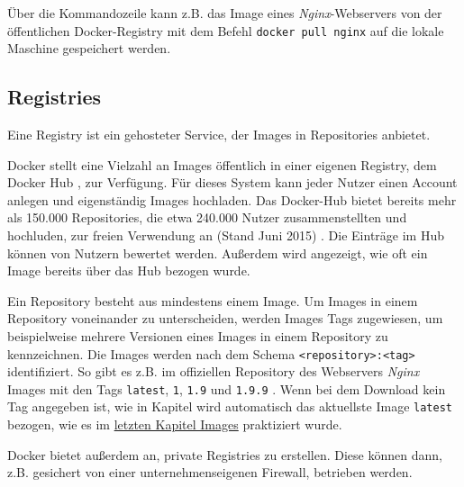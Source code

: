 \documentclass[11pt,a4paper,oneside]{report}
\begin{document}
      Über die Kommandozeile kann z.B. das Image eines \emph{Nginx}-Webservers von der öffentlichen Docker-Registry mit dem Befehl \texttt{docker pull nginx} auf die lokale Maschine gespeichert werden.


    \subsection{Registries}
      Eine Registry ist ein gehosteter Service, der Images in Repositories anbietet.

      Docker stellt eine Vielzahl an Images öffentlich in einer eigenen Registry, dem Docker Hub \cite[S.11]{dockerBook}, zur Verfügung. Für dieses System kann jeder Nutzer einen Account anlegen und eigenständig Images hochladen. Das Docker-Hub bietet bereits mehr als 150.000 Repositories, die etwa 240.000 Nutzer zusammenstellten und hochluden, zur freien Verwendung an (Stand Juni 2015) \cite[S.16]{slideshareDockercon15}. Die Einträge im Hub können von Nutzern bewertet werden. Außerdem wird angezeigt, wie oft ein Image bereits über das Hub bezogen wurde.

      Ein Repository besteht aus mindestens einem Image. Um Images in einem Repository voneinander zu unterscheiden, werden Images Tags zugewiesen, um beispielweise mehrere Versionen eines Images in einem Repository zu kennzeichnen. Die Images werden nach dem Schema \texttt{<repository>:<tag>} identifiziert. So gibt es z.B. im offiziellen Repository des Webservers \emph{Nginx} Images mit den Tags \texttt{latest}, \texttt{1}, \texttt{1.9} und \texttt{1.9.9} \cite{dockerhubNginx}. Wenn bei dem Download kein Tag angegeben ist, wie in Kapitel wird automatisch das aktuellste Image \texttt{latest} bezogen, wie es im \hyperref[dockerImages]{letzten Kapitel \glqq{}Images\grqq{}} praktiziert wurde.





      Docker bietet außerdem an, private Registries zu erstellen. Diese können dann, z.B. gesichert von einer unternehmenseigenen Firewall, betrieben werden.
\end{document}
